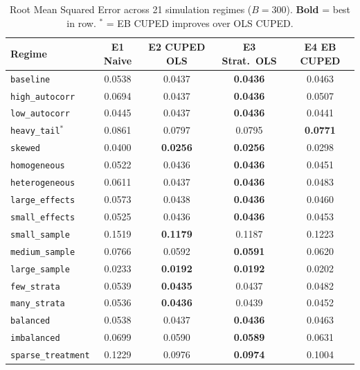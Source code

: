 \documentclass[12pt]{article}
\theoremstyle{plain}
\theoremstyle{definition}
\begin{document}
\begin{table}[htbp]
\centering
\caption{Root Mean Squared Error across 21 simulation regimes ($B = 300$).
         \textbf{Bold} = best in row.
         $^*$ = EB CUPED improves over OLS CUPED.}
\label{tab:rmse_summary}
\small
\begin{tabular}{l
  S[table-format=1.4]
  S[table-format=1.4]
  S[table-format=1.4]
  S[table-format=1.4]}
\toprule
\textbf{Regime}
  & {\textbf{E1 Naive}}
  & {\textbf{E2 CUPED OLS}}
  & {\textbf{E3 Strat.\ OLS}}
  & {\textbf{E4 EB CUPED}} \\
\midrule
\texttt{baseline}           & 0.0538 & 0.0437 & \textbf{0.0436} & 0.0463 \\
\texttt{high\_autocorr}     & 0.0694 & 0.0437 & \textbf{0.0436} & 0.0507 \\
\texttt{low\_autocorr}      & 0.0445 & 0.0437 & \textbf{0.0436} & 0.0441 \\
\midrule
\texttt{heavy\_tail}$^*$    & 0.0861 & 0.0797 & 0.0795 & \textbf{0.0771} \\
\texttt{skewed}             & 0.0400 & \textbf{0.0256} & \textbf{0.0256} & 0.0298 \\
\midrule
\texttt{homogeneous}        & 0.0522 & 0.0436 & \textbf{0.0436} & 0.0451 \\
\texttt{heterogeneous}      & 0.0611 & 0.0437 & \textbf{0.0436} & 0.0483 \\
\texttt{large\_effects}     & 0.0573 & 0.0438 & \textbf{0.0436} & 0.0460 \\
\texttt{small\_effects}     & 0.0525 & 0.0436 & \textbf{0.0436} & 0.0453 \\
\midrule
\texttt{small\_sample}      & 0.1519 & \textbf{0.1179} & 0.1187 & 0.1223 \\
\texttt{medium\_sample}     & 0.0766 & 0.0592 & \textbf{0.0591} & 0.0620 \\
\texttt{large\_sample}      & 0.0233 & \textbf{0.0192} & \textbf{0.0192} & 0.0202 \\
\midrule
\texttt{few\_strata}        & 0.0539 & \textbf{0.0435} & 0.0437 & 0.0482 \\
\texttt{many\_strata}       & 0.0536 & \textbf{0.0436} & 0.0439 & 0.0452 \\
\midrule
\texttt{balanced}           & 0.0538 & 0.0437 & \textbf{0.0436} & 0.0463 \\
\texttt{imbalanced}         & 0.0699 & 0.0590 & \textbf{0.0589} & 0.0631 \\
\texttt{sparse\_treatment}  & 0.1229 & 0.0976 & \textbf{0.0974} & 0.1004 \\

\end{tabular}
\end{table}
\end{document}
